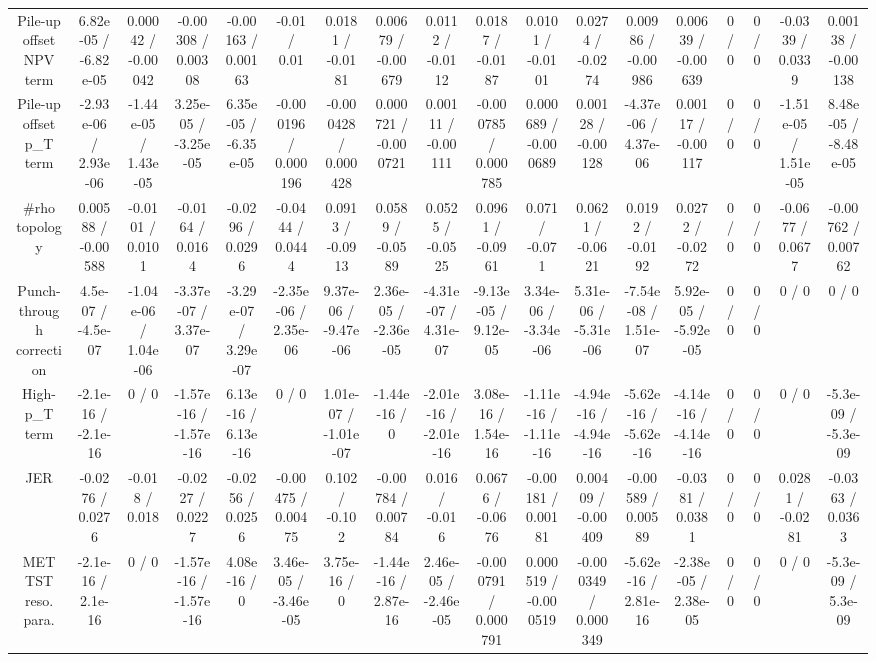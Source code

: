 \documentclass[10pt]{article}
\begin{document}
\begin{table}[htbp]
\begin{center}
\begin{tabular}{|c|c|c|c|c|c|c|c|c|c|c|c|c|c|c|c|c|c|}
  Pile-up offset NPV term & 6.82e-05 / -6.82e-05 & 0.00042 / -0.00042 & -0.00308 / 0.00308 & -0.00163 / 0.00163 & -0.01 / 0.01 & 0.0181 / -0.0181 & 0.00679 / -0.00679 & 0.0112 / -0.0112 & 0.0187 / -0.0187 & 0.0101 / -0.0101 & 0.0274 / -0.0274 & 0.00986 / -0.00986 & 0.00639 / -0.00639 & 0 / 0 & 0 / 0 & -0.0339 / 0.0339 & 0.00138 / -0.00138 \\ 
  Pile-up offset p_{T} term & -2.93e-06 / 2.93e-06 & -1.44e-05 / 1.43e-05 & 3.25e-05 / -3.25e-05 & 6.35e-05 / -6.35e-05 & -0.000196 / 0.000196 & -0.000428 / 0.000428 & 0.000721 / -0.000721 & 0.00111 / -0.00111 & -0.000785 / 0.000785 & 0.000689 / -0.000689 & 0.00128 / -0.00128 & -4.37e-06 / 4.37e-06 & 0.00117 / -0.00117 & 0 / 0 & 0 / 0 & -1.51e-05 / 1.51e-05 & 8.48e-05 / -8.48e-05 \\ 
  #rho topology & 0.00588 / -0.00588 & -0.0101 / 0.0101 & -0.0164 / 0.0164 & -0.0296 / 0.0296 & -0.0444 / 0.0444 & 0.0913 / -0.0913 & 0.0589 / -0.0589 & 0.0525 / -0.0525 & 0.0961 / -0.0961 & 0.071 / -0.071 & 0.0621 / -0.0621 & 0.0192 / -0.0192 & 0.0272 / -0.0272 & 0 / 0 & 0 / 0 & -0.0677 / 0.0677 & -0.00762 / 0.00762 \\ 
  Punch-through correction & 4.5e-07 / -4.5e-07 & -1.04e-06 / 1.04e-06 & -3.37e-07 / 3.37e-07 & -3.29e-07 / 3.29e-07 & -2.35e-06 / 2.35e-06 & 9.37e-06 / -9.47e-06 & 2.36e-05 / -2.36e-05 & -4.31e-07 / 4.31e-07 & -9.13e-05 / 9.12e-05 & 3.34e-06 / -3.34e-06 & 5.31e-06 / -5.31e-06 & -7.54e-08 / 1.51e-07 & 5.92e-05 / -5.92e-05 & 0 / 0 & 0 / 0 & 0 / 0 & 0 / 0 \\ 
  High-p_{T} term & -2.1e-16 / -2.1e-16 & 0 / 0 & -1.57e-16 / -1.57e-16 & 6.13e-16 / 6.13e-16 & 0 / 0 & 1.01e-07 / -1.01e-07 & -1.44e-16 / 0 & -2.01e-16 / -2.01e-16 & 3.08e-16 / 1.54e-16 & -1.11e-16 / -1.11e-16 & -4.94e-16 / -4.94e-16 & -5.62e-16 / -5.62e-16 & -4.14e-16 / -4.14e-16 & 0 / 0 & 0 / 0 & 0 / 0 & -5.3e-09 / -5.3e-09 \\ 
  JER & -0.0276 / 0.0276 & -0.018 / 0.018 & -0.0227 / 0.0227 & -0.0256 / 0.0256 & -0.00475 / 0.00475 & 0.102 / -0.102 & -0.00784 / 0.00784 & 0.016 / -0.016 & 0.0676 / -0.0676 & -0.00181 / 0.00181 & 0.00409 / -0.00409 & -0.00589 / 0.00589 & -0.0381 / 0.0381 & 0 / 0 & 0 / 0 & 0.0281 / -0.0281 & -0.0363 / 0.0363 \\ 
  MET TST reso. para. & -2.1e-16 / 2.1e-16 & 0 / 0 & -1.57e-16 / -1.57e-16 & 4.08e-16 / 0 & 3.46e-05 / -3.46e-05 & 3.75e-16 / 0 & -1.44e-16 / 2.87e-16 & 2.46e-05 / -2.46e-05 & -0.000791 / 0.000791 & 0.000519 / -0.000519 & -0.000349 / 0.000349 & -5.62e-16 / 2.81e-16 & -2.38e-05 / 2.38e-05 & 0 / 0 & 0 / 0 & 0 / 0 & -5.3e-09 / 5.3e-09 \\ 

\end{tabular}
\end{center}
\end{table}
\end{document}
